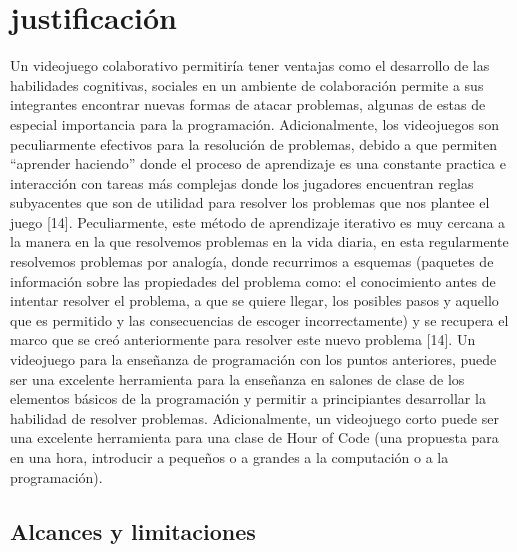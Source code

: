 \section{justificación}
Un videojuego colaborativo permitiría tener ventajas como el desarrollo de las habilidades cognitivas, sociales en un ambiente de colaboración permite a sus integrantes encontrar nuevas formas de atacar problemas, algunas de estas de especial importancia para la programación. 
Adicionalmente, los videojuegos son peculiarmente efectivos para la resolución de problemas, debido a que permiten “aprender haciendo” donde el proceso de aprendizaje es una constante practica e interacción con tareas más complejas donde los jugadores encuentran reglas subyacentes que son de utilidad para resolver los problemas que nos plantee el juego [14]. Peculiarmente, este método de aprendizaje iterativo es muy cercana a la manera en la que resolvemos problemas en la vida diaria, en esta regularmente resolvemos problemas por analogía, donde recurrimos a esquemas (paquetes de información sobre las propiedades del problema como: el conocimiento antes de intentar resolver el problema, a que se quiere llegar, los posibles pasos y aquello que es permitido y las consecuencias de escoger incorrectamente) y se recupera el marco que se creó anteriormente para resolver este nuevo problema [14].
Un videojuego para la enseñanza de programación con los puntos anteriores, puede ser una excelente herramienta para la enseñanza en salones de clase de los elementos básicos de la programación y permitir a principiantes desarrollar la habilidad de resolver problemas. Adicionalmente, un videojuego corto puede ser una excelente herramienta para una clase de Hour of Code (una propuesta para en una hora, introducir a pequeños o a grandes a la computación o a la programación).


\subsection{Alcances y limitaciones}